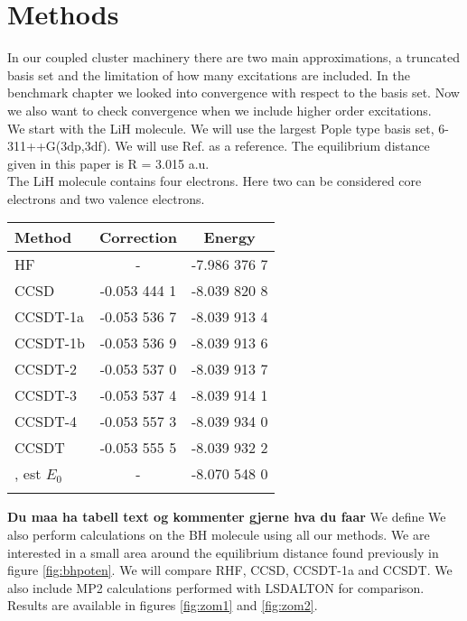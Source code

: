 \section{Methods}
In our coupled cluster machinery there are two main approximations, a
truncated basis set and the limitation of how many excitations are
included. In the benchmark chapter we looked into convergence with
respect to the basis set. Now we also want to check convergence when
we include higher order excitations. \\

We start with the LiH molecule. We will use the largest Pople type
basis set, 6-311++G(3dp,3df). We will use
Ref.\cite{very_accurate_lih_poten} as a reference. The equilibrium
distance given in this paper is R = 3.015 a.u. \\

The LiH molecule contains four electrons. Here two can be considered core electrons and two valence electrons. 
 
\begin{center}
\begin{tabular}{ l c c}
	\hline
  	Method & Correction & Energy \\ \hline
  	HF & - &  -7.986 376 7\\
  	CCSD     &  -0.053 444 1  & -8.039 820 8 \\ 
    CCSDT-1a &  -0.053 536 7  & -8.039 913 4 \\ 
  	CCSDT-1b &  -0.053 536 9  & -8.039 913 6 \\
  	CCSDT-2  &  -0.053 537 0  & -8.039 913 7        \\ 
  	CCSDT-3  &  -0.053 537 4  & -8.039 914 1        \\ 
  	CCSDT-4  &  -0.053 557 3  & -8.039 934 0    \\ 
  	CCSDT    &  -0.053 555 5  &  -8.039 932 2    \\ 
  	\cite{very_accurate_lih_poten}, est $E_0$ & - & -8.070 548 0 \\ \hline
  	\\
	\end{tabular}
\end{center}
{\bf Du maa ha tabell text og kommenter gjerne hva du faar} We define
We also perform calculations on the BH molecule using all our
methods. We are interested in a small area around the equilibrium
distance found previously in figure \ref{fig:bhpoten}. We will compare
RHF, CCSD, CCSDT-1a and CCSDT. We also include MP2 calculations
performed with LSDALTON for comparison. Results are available in
figures \ref{fig:zom1} and \ref{fig:zom2}.

